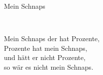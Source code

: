 \begin{song}{Mein Schnaps}
	
	
	\\
	
	Mein Schnaps der hat Prozente,\\
	Prozente hat mein Schnaps,\\
	und hätt er nicht Prozente,\\
	so wär es nicht mein Schnaps.
	
\end{song}
